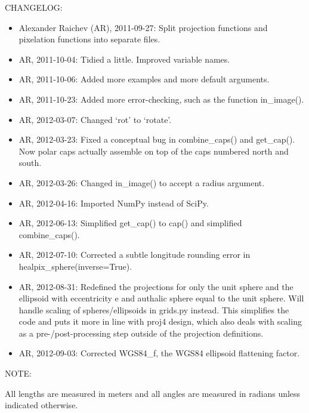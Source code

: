\documentclass[a4paper,12ptopenany,oneside]{sphinxmanual}
\begin{document}
CHANGELOG:
\begin{itemize}
\item {} 
Alexander Raichev (AR), 2011-09-27: Split projection functions and pixelation 
functions into separate files.

\item {} 
AR, 2011-10-04: Tidied a little. Improved variable names.

\item {} 
AR, 2011-10-06: Added more examples and more default arguments.

\item {} 
AR, 2011-10-23: Added more error-checking, such as the function in\_image().

\item {} 
AR, 2012-03-07: Changed `rot' to `rotate'.

\item {} 
AR, 2012-03-23: Fixed a conceptual bug in combine\_caps() and get\_cap(). Now polar caps actually assemble on top of the caps numbered north and south.

\item {} 
AR, 2012-03-26: Changed in\_image() to accept a radius argument.

\item {} 
AR, 2012-04-16: Imported NumPy instead of SciPy.

\item {} 
AR, 2012-06-13: Simplified get\_cap() to cap() and simplified combine\_caps().

\item {} 
AR, 2012-07-10: Corrected a subtle longitude rounding error in healpix\_sphere(inverse=True).

\item {} 
AR, 2012-08-31: Redefined the projections for only the unit sphere and 
the ellipsoid with eccentricity e and authalic sphere equal to the unit
sphere. Will handle scaling of spheres/ellipsoids in grids.py  
instead. This simplifies the code and puts it more in line with proj4
design, which also deals with scaling as a pre-/post-processing step outside
of the projection definitions.

\item {} 
AR, 2012-09-03: Corrected WGS84\_f, the WGS84 ellipsoid flattening factor.

\end{itemize}

NOTE:

All lengths are measured in meters and all angles are measured in radians 
unless indicated otherwise.
\end{document}
